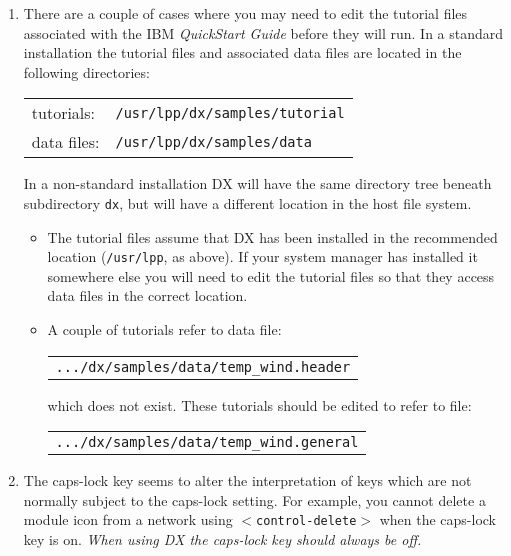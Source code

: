 \begin{enumerate}

  \item There are a couple of cases where you may need to edit the
   tutorial files associated with the IBM {\it QuickStart
   Guide}\cite{QUICKS} before they will run. In a standard installation
   the tutorial files and associated data files are located in the
   following directories:

  \begin{tabular}{ll}
   tutorials:   &  {\tt /usr/lpp/dx/samples/tutorial} \\
   data files:  &  {\tt /usr/lpp/dx/samples/data} \\
  \end{tabular}

   In a non-standard installation DX will have the same directory tree
   beneath subdirectory {\tt dx}, but will have a different location
   in the host file system.

  \begin{itemize}

    \item The tutorial files assume that DX has been installed in the
     recommended location ({\tt{/usr/lpp}}, as above). If your system
     manager has installed it somewhere else you will need to edit
     the tutorial files so that they access data files in the correct
     location.

    \item A couple of tutorials refer to data file:

    \begin{tabular}{l}
     {\tt .../dx/samples/data/temp\_wind.header} \\
    \end{tabular}

     which does not exist. These tutorials should be edited to refer
     to file:

    \begin{tabular}{l}
     {\tt .../dx/samples/data/temp\_wind.general} \\
    \end{tabular}

  \end{itemize}

  \item The caps-lock key seems to alter the interpretation of keys
   which are not normally subject to the caps-lock setting. For example,
   you cannot delete a module icon from a network using 
   {\tt{$<$control-delete$>$}} when the caps-lock key is on. {\it When using
   DX the caps-lock key should always be off.}


\end{enumerate}
